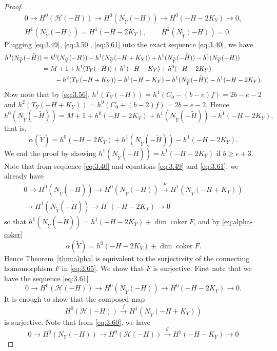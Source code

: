 \documentclass[11pt,twoside]{amsart}
\theoremstyle{plain}
\theoremstyle{definition}
\newcommand{\coker}{\operatorname{coker}}
\newcommand{\Yt}{\widetilde{Y}}
\newcommand{\Ht}{\widetilde{H}}
\newcommand{\NY}{N_{Y}}
\newcommand{\NYt}{N_{\Yt}}
\newcommand{\Hc}{\mathcal{H}}
\begin{document}
\begin{proof}
\begin{equation}\label{eq:3.61}
\begin{gathered}
0\to H^0(\Hc(-H))\to H^0(\NYt(-H))\to H^0(-H-2K_Y)\to 0,\\
H^1(\NYt(-H))=H^1(-H-2K_Y),\qquad H^2(\NYt(-H))=0 .
\end{gathered}
\end{equation}
Plugging \eqref{eq:3.49}, \eqref{eq:3.50}, \eqref{eq:3.61} into the exact sequence \eqref{eq:3.40}, we have
\begin{align}
h^0(\NYt(-\Ht))&=h^0(\NYt(-H))-h^1(\NYt(-H+K_Y))+h^1(\NYt(-\Ht))-h^1(\NYt(-H))\label{eq:3.62}\\
&=M+1+h^1(T_Y(-H))+h^1(-H-K_Y)+h^0(-H-2K_Y)\notag\\
&\qquad-h^2(T_Y(-H+K_Y))-h^1(-H-K_Y)+h^1(\NYt(-\Ht))-h^1(-H-2K_Y).\label{eq:3.63}
\end{align}
Now note that by \eqref{eq:3.56}, $h^1(T_Y(-H))=h^1(C_0-(b-e)f)=2b-e-2$ and $h^2(T_Y(-H+K_Y))=h^0(C_0+(b-2)f)=2b-e-2$. Hence
\begin{equation}\label{eq:3.64}
h^0(\NYt(-\Ht))=M+1+h^0(-H-2K_Y)+h^1(\NYt(-\Ht))-h^1(-H-2K_Y),
\end{equation}
that is,
\begin{equation}\label{eq:alpha-coker}
\alpha(\Yt)=h^0(-H-2K_Y)+h^1(\NYt(-\Ht))-h^1(-H-2K_Y).
\end{equation}
We end the proof by showing $h^1(\NYt(-\Ht))=h^1(-H-2K_Y)$ if $b\ge e+3$. Note that from sequence \eqref{eq:3.40} and equations \eqref{eq:3.49} and \eqref{eq:3.61}, we already have
\begin{multline}\label{eq:3.65}
0\to H^0(\NYt(-\Ht))\to H^0(\NYt(-H))\xrightarrow{\ F\ } H^1(\NYt(-H+K_Y))\\
\to H^1(\NYt(-\Ht))\to H^1(-H-2K_Y)\to 0
\end{multline}
so that $h^1(\NYt(-\Ht))=h^1(-H-2K_Y)+\dim\coker F$, and by \eqref{eq:alpha-coker}
\begin{equation}\label{eq:alpha-F}
\alpha(\Yt)=h^0(-H-2K_Y)+\dim\coker F .
\end{equation}
Hence Theorem~\ref{thm:alpha} is equivalent to the surjectivity of the connecting homomorphism $F$ in \eqref{eq:3.65}. We show that $F$ is surjective. First note that we have the sequence \eqref{eq:3.61}
\[
0\to H^0(\Hc(-H))\to H^0(\NYt(-H))\to H^0(-H-2K_Y)\to 0 .
\]
It is enough to show that the composed map
\[
H^0(\Hc(-H))\xrightarrow{\ f\ } H^1(\NYt(-H+K_Y))
\]
is surjective. Note that from \eqref{eq:3.60}, we have
\[
0\to H^0(\NY(-H))\to H^0(\Hc(-H))\xrightarrow{\ g\ } H^1(-H-K_Y)\to 0
\]
\end{proof}
\end{document}
